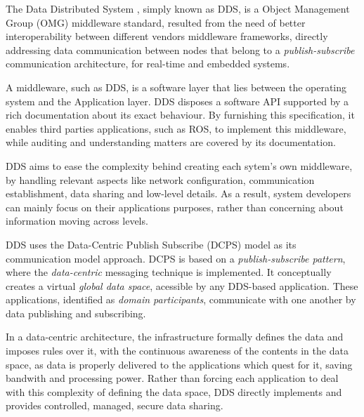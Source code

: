 The Data Distributed System \cite{3}, simply known as DDS, is a Object Management Group (OMG) middleware standard, resulted from the need of better interoperability between different vendors middleware frameworks, directly addressing data communication between nodes that belong to a \textit{publish-subscribe} communication architecture, for real-time and embedded systems. %
            
A middleware, such as DDS, is a software layer that lies between the operating system and the Application layer. \cite{dds-what-is} DDS disposes a software API supported by a rich documentation about its exact behaviour. By furnishing this specification, it enables third parties applications, such as ROS, to implement this middleware, while auditing and understanding matters are covered by its documentation.

DDS aims to ease the complexity behind creating each sytem's own middleware, by handling relevant aspects like network configuration, communication establishment, data sharing and low-level details. As a result, system developers can mainly focus on their applications purposes, rather than concerning about information moving across levels. 


DDS uses the Data-Centric Publish Subscribe (DCPS) model as its communication model approach. DCPS is based on a \textit{publish-subscribe pattern}, where the \textit{data-centric} messaging technique is implemented. It conceptually creates a virtual \textit{global data space}, acessible by any DDS-based application. These applications, identified as \textit{domain participants}, communicate with one another by data publishing and subscribing. \cite{maruyama2016exploring} 

In a data-centric architecture, the infrastructure formally defines the data and imposes rules over it, with the continuous awareness of the contents in the data space, as data is properly delivered to the applications which quest for it, saving bandwith and processing power. \cite{3} Rather than forcing each application to deal with this complexity of defining the data space, DDS directly implements and provides controlled, managed, secure data sharing. \cite{pardo2005introduction}

